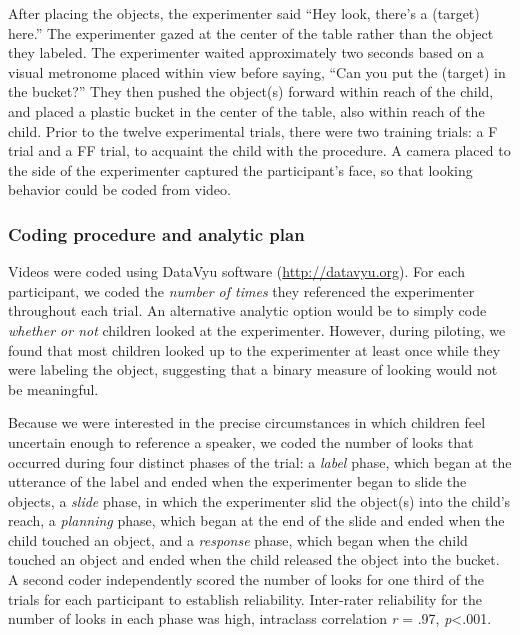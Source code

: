 \documentclass[a4paper,man,apacite,floatsintext]{apa6}
\begin{document}
After placing the objects, the experimenter said ``Hey look, there's a
(target) here.'' The experimenter gazed at the center of the table
rather than the object they labeled. The experimenter waited
approximately two seconds based on a visual metronome placed within view
before saying, ``Can you put the (target) in the bucket?'' They then
pushed the object(s) forward within reach of the child, and placed a
plastic bucket in the center of the table, also within reach of the
child. Prior to the twelve experimental trials, there were two training
trials: a F trial and a FF trial, to acquaint the child with the
procedure. A camera placed to the side of the experimenter captured the
participant's face, so that looking behavior could be coded from video.

\subsubsection{Coding procedure and analytic
plan}\label{coding-procedure-and-analytic-plan}

Videos were coded using DataVyu software (\url{http://datavyu.org}). For
each participant, we coded the \emph{number of times} they referenced
the experimenter throughout each trial. An alternative analytic option
would be to simply code \emph{whether or not} children looked at the
experimenter. However, during piloting, we found that most children
looked up to the experimenter at least once while they were labeling the
object, suggesting that a binary measure of looking would not be
meaningful.

Because we were interested in the precise circumstances in which
children feel uncertain enough to reference a speaker, we coded the
number of looks that occurred during four distinct phases of the trial:
a \emph{label} phase, which began at the utterance of the label and
ended when the experimenter began to slide the objects, a \emph{slide}
phase, in which the experimenter slid the object(s) into the child's
reach, a \emph{planning} phase, which began at the end of the slide and
ended when the child touched an object, and a \emph{response} phase,
which began when the child touched an object and ended when the child
released the object into the bucket. A second coder independently scored
the number of looks for one third of the trials for each participant to
establish reliability. Inter-rater reliability for the number of looks
in each phase was high, intraclass correlation \emph{r} = .97,
\emph{p}\textless{}.001.
\end{document}
